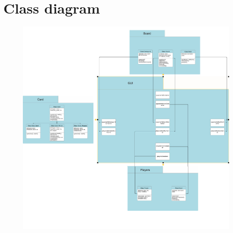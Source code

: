 \documentclass[12pt,a4paper]{article}
\begin{document}
\section{Class diagram}
\begin{figure}[h]
\centering 
\includegraphics[width=1\textwidth]{img/Diagram.jpg}
\end{figure}

\newpage
\end{document}
